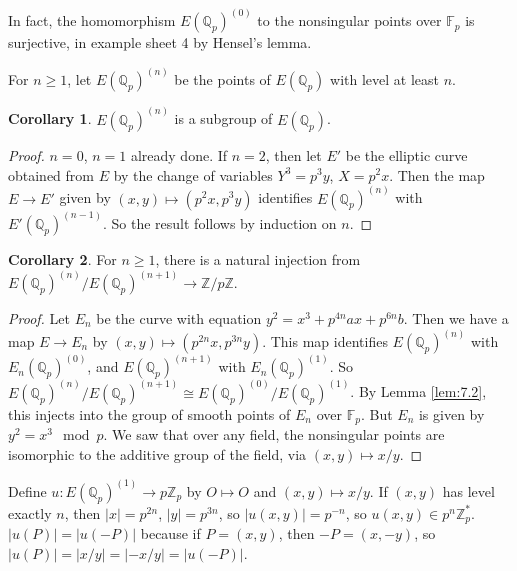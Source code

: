 \documentclass{article}
\newcommand{\F}{\mathbb{F}}
\newcommand{\Z}{\mathbb{Z}}
\newcommand{\Q}{\mathbb{Q}}
\newcommand{\rb}[1]{\left( #1 \right)}
\newcommand{\abs}[1]{\left\lvert #1 \right\rvert}
\theoremstyle{definition}\newtheorem{definition}{Definition}[section]
\theoremstyle{definition}\newtheorem{remark}[definition]{Remark}
\theoremstyle{definition}\newtheorem*{example}{Example}
\theoremstyle{definition}\newtheorem*{note}{Note}
\newtheorem{corollary}[definition]{Corollary}
\begin{document}
In fact, the homomorphism $ E\rb{\Q_p}^{\rb{0}} $ to the nonsingular points over $ \F_p $ is surjective, in example sheet 4 by Hensel's lemma.


For $ n \ge 1 $, let $ E\rb{\Q_p}^{\rb{n}} $ be the points of $ E\rb{\Q_p} $ with level at least $ n $.

\begin{corollary}
$ E\rb{\Q_p}^{\rb{n}} $ is a subgroup of $ E\rb{\Q_p} $.
\end{corollary}

\begin{proof}
$ n = 0 $, $ n = 1 $ already done. If $ n = 2 $, then let $ E' $ be the elliptic curve obtained from $ E $ by the change of variables $ Y^3 = p^3y $, $ X = p^2x $. Then the map $ E \to E' $ given by $ \rb{x, y} \mapsto \rb{p^2x, p^3y} $ identifies $ E\rb{\Q_p}^{\rb{n}} $ with $ E'\rb{\Q_p}^{\rb{n - 1}} $. So the result follows by induction on $ n $.
\end{proof}

\begin{corollary}
For $ n \ge 1 $, there is a natural injection from $ E\rb{\Q_p}^{\rb{n}} / E\rb{\Q_p}^{\rb{n + 1}} \to \Z / p\Z $.
\end{corollary}

\begin{proof}
Let $ E_n $ be the curve with equation $ y^2 = x^3 + p^{4n}ax + p^{6n}b $. Then we have a map $ E \to E_n $ by $ \rb{x, y} \mapsto \rb{p^{2n}x, p^{3n}y} $. This map identifies $ E\rb{\Q_p}^{\rb{n}} $ with $ E_n\rb{\Q_p}^{\rb{0}} $, and $ E\rb{\Q_p}^{\rb{n + 1}} $ with $ E_n\rb{\Q_p}^{\rb{1}} $. So $ E\rb{\Q_p}^{\rb{n}} / E\rb{\Q_p}^{\rb{n + 1}} \cong E\rb{\Q_p}^{\rb{0}} / E\rb{\Q_p}^{\rb{1}} $. By Lemma \ref{lem:7.2}, this injects into the group of smooth points of $ E_n $ over $ \F_p $. But $ E_n $ is given by $ y^2 = x^3 \mod p $. We saw that over any field, the nonsingular points are isomorphic to the additive group of the field, via $ \rb{x, y} \mapsto x / y $.
\end{proof}

Define $ u : E\rb{\Q_p}^{\rb{1}} \to p\Z_p $ by $ O \mapsto O $ and $ \rb{x, y} \mapsto x / y $. If $ \rb{x, y} $ has level exactly $ n $, then $ \abs{x} = p^{2n} $, $ \abs{y} = p^{3n} $, so $ \abs{u\rb{x, y}} = p^{-n} $, so $ u\rb{x, y} \in p^n\Z_p^* $. $ \abs{u\rb{P}} = \abs{u\rb{-P}} $ because if $ P = \rb{x, y} $, then $ -P = \rb{x, -y} $, so $ \abs{u\rb{P}} = \abs{x / y} = \abs{-x / y} = \abs{u\rb{-P}} $.
\end{document}
